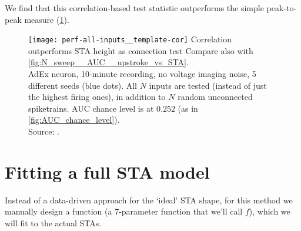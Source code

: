 We find that this correlation-based test statistic outperforms the simple peak-to-peak measure (\cref{fig:N_sweep__AUC__template-corr_vs_STA}).

\begin{figure}
    \texttt{[image: perf-all-inputs\_\_template-cor]}
    \captionn
    {Correlation outperforms STA height as connection test}
    {Compare also with \cref{fig:N_sweep__AUC__upstroke_vs_STA}.\\
    AdEx neuron, 10-minute recording, no voltage imaging noise,  5 different seeds (blue dots). All $N$ inputs are tested (instead of just the highest firing ones), in addition to $N$ random unconnected spiketrains. AUC chance level is at $0.252$ (as in \cref{fig:AUC_chance_level}).\\
    Source: .}
    \label{fig:N_sweep__AUC__template-corr_vs_STA}
\end{figure}





\clearpage
\FloatBarrier
\section{Fitting a full STA model}
\label{sec:fitting-a-full-STA-model}


Instead of a data-driven approach for the `ideal' STA shape, for this method we manually design a function (a 7-parameter function that we'll call $f$), which we will fit to the actual STAs.


